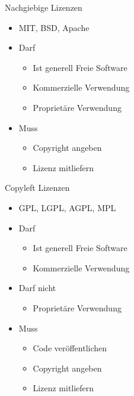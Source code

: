 \begin{frame}{Nachgiebige Lizenzen}
	\begin{itemize}
		\item MIT, BSD, Apache
		\item Darf
		\begin{itemize}
			\item Ist generell Freie Software
			\item Kommerzielle Verwendung
			\item Proprietäre Verwendung
		\end{itemize}
		\item Muss
		\begin{itemize}
			\item Copyright angeben
			\item Lizenz mitliefern
		\end{itemize}
	\end{itemize}
\end{frame}

\begin{frame}{Copyleft Lizenzen}
	\begin{itemize}
		\item GPL, LGPL, AGPL, MPL
		\item Darf
		\begin{itemize}
			\item Ist generell Freie Software
			\item Kommerzielle Verwendung
		\end{itemize}
		\item Darf nicht
		\begin{itemize}
			\item Proprietäre Verwendung
		\end{itemize}
		\item Muss
		\begin{itemize}
			\item Code veröffentlichen
			\item Copyright angeben
			\item Lizenz mitliefern
		\end{itemize}
	\end{itemize}
\end{frame}


